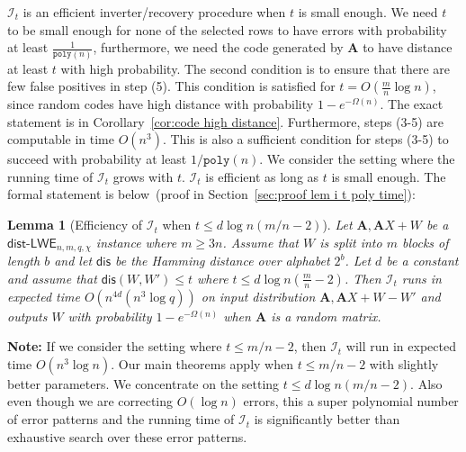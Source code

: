 \documentclass[11pt]{article}
\newcommand{\secref}[1]{\mbox{Section~\ref{#1}}}
\newcommand{\corref}[1]{\mbox{Corollary~\ref{#1}}}
\newcommand{\lemref}[1]{\mbox{Lemma~\ref{#1}}}
\newcommand{\class}[1]{{\ensuremath{\mathsf{#1}}}}
\newcommand{\vect}[1]{\ensuremath{\textbf{#1}}}
\newcommand{\dis}{\ensuremath{\mathsf{dis}}}
\newcommand{\poly}{\ensuremath{\mathtt{poly}}\xspace}
\newcommand{\distLWE}{\ensuremath{\class{dist\mbox{-}LWE}}}
\newtheorem{lemma}[theorem]{Lemma}
\newcommand{\authnote}[2]{{\textcolor{red}{\textsf{#1 notes: }\textcolor{blue}{ #2}}\marginpar{\textcolor{red}{\textbf{!!!!!}}}}}
\newcommand{\authnote}[2]{}
\newcommand{\lnote}[1]{{\authnote{Leo}{#1}}}
\newcommand{\vA}{\vect{A}}
\begin{document}
$\mathcal{I}_t$ is an efficient inverter/recovery procedure when $t$ is small enough.  We need $t$ to be small enough for none of the selected rows to have errors with probability at least $\frac{1}{\poly(n)}$, furthermore, we need the code generated by $\vA$ to have distance at least $t$ with high probability.  The second condition is to ensure that there are few false positives in step (5).  This condition is satisfied for $t = O(\frac{m}{n}\log n)$, since random codes have high distance with probability $1-e^{-\Omega(n)}$.  The exact statement is in \corref{cor:code high distance}.  Furthermore, steps (3-5) are computable in time $O(n^3)$.
This is also a sufficient condition for steps (3-5) to succeed with probability at least $1/\poly(n)$.  We consider the setting where the running time of $\mathcal{I}_t$ grows with $t$.  $\mathcal{I}_t$ is efficient as long as $t$ is small enough.  The formal statement is below~(proof in \secref{sec:proof lem i t poly time}):
\begin{lemma}[Efficiency of $\mathcal{I}_t$ when $t\leq d\log n (m/n-2)$]
\label{lem:i t poly time}
Let $\vA, \vA X+W$ be a  $\distLWE_{n,m, q, \chi}$ instance where $m\geq 3n$.  Assume that $W$ is split into $m$ blocks of length $b$ and let $\dis$ be the Hamming distance over alphabet $2^b$.  Let $d$ be a constant and assume that $\dis(W, W')\leq t$ where $t\leq d\log n(\frac{m}{n}-2)$.  Then $\mathcal{I}_t$ runs in expected time $O(n^{4d}(n^3\log q))$ on input distribution $\vA, \vA X+W - W'$ and outputs $W$ with probability $1-e^{-\Omega(n)}$ when $\vA$ is a random matrix.
\end{lemma}
\textbf{Note:} If we consider the setting where $t\leq m/n-2$, then $\mathcal{I}_t$ will run in expected time $O(n^3\log n)$.  Our main theorems apply when $t\leq m/n-2$ with slightly better parameters.  We concentrate on the setting $t\leq d\log n(m/n-2)$.  Also even though we are correcting $O(\log n)$ errors, this a super polynomial number of error patterns and the running time of $\mathcal{I}_t$ is significantly better than exhaustive search over these error patterns.
\end{document}
